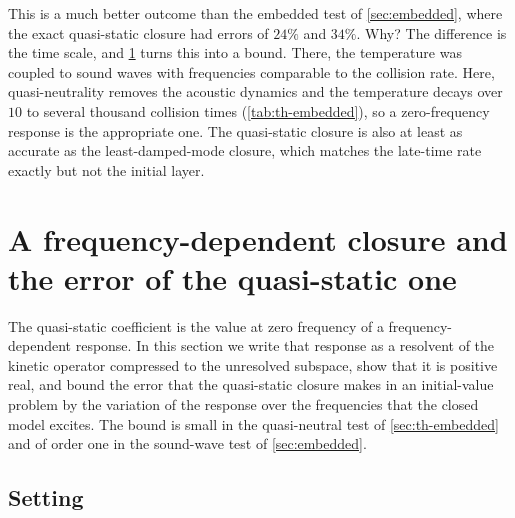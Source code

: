 \documentclass[11pt]{article}
\theoremstyle{definition}
\theoremstyle{remark}
\numberwithin{equation}{section}
\begin{document}
This is a much better outcome than the embedded test of \cref{sec:embedded}, where the exact quasi-static closure had errors of $24\%$ and
$34\%$. Why? The difference is the time scale, and \cref{sec:memory} turns
this into a bound. There, the temperature
was coupled to sound waves with frequencies comparable to the collision
rate. Here, quasi-neutrality removes the acoustic dynamics and the
temperature decays over $10$ to several thousand collision times
(\cref{tab:th-embedded}), so a zero-frequency response is the appropriate
one. The quasi-static closure is also at least as accurate as the
least-damped-mode closure, which matches the late-time rate exactly but
not the initial layer.

\FloatBarrier
\section{A frequency-dependent closure and the error of the quasi-static one}\label{sec:memory}

The quasi-static coefficient is the value at zero frequency of a
frequency-dependent response. In this section we write that response as a
resolvent of the kinetic operator compressed to the unresolved subspace,
show that it is positive real, and bound the error that the quasi-static
closure makes in an initial-value problem by the variation of the response
over the frequencies that the closed model excites. The bound is small in
the quasi-neutral test of \cref{sec:th-embedded} and of order one in the
sound-wave test of \cref{sec:embedded}.

\subsection{Setting}
\end{document}
